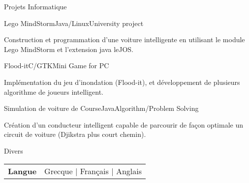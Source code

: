\documentclass{resume} %
\begin{document}
\begin{rSection}{Projets Informatique}
	\begin{rSubsection}{Lego MindStorm}{Java/Linux}{University project }{}
		\item Construction et programmation d'une voiture intelligente en utilisant le module Lego MindStorm et l'extension java leJOS.
	\end{rSubsection}
	
	
	\begin{rSubsection}{Flood-it}{C/GTK}{Mini Game for PC}{}
		\item Implémentation du jeu d'inondation (Flood-it), et développement de plusieurs algorithme de joueurs intelligent.
	\end{rSubsection}
	
	\begin{rSubsection}{Simulation de voiture de Course}{Java}{Algorithm/Problem Solving}{}
		\item Création d'un conducteur intelligent capable de parcourir de façon optimale un circuit de voiture (Djikstra plus court chemin).
	\end{rSubsection}
	
\end{rSection}

\begin{rSection}{Divers}
	
	\begin{tabular}{ @{} >{\bfseries}l @{\hspace{6ex}} l }
		Langue & Grecque | Français | Anglais \\
	\end{tabular}
		
\end{rSection}
\end{document}
